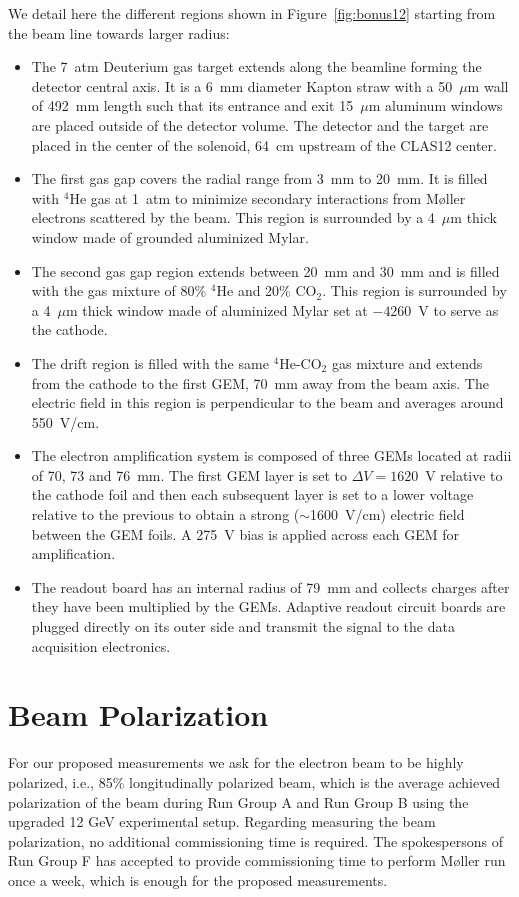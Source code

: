 We detail here the different regions shown in Figure~\ref{fig:bonus12} starting 
from the beam line towards larger radius:\\
\begin{itemize}
  \item The 7~atm Deuterium gas target extends along the beamline forming the 
     detector central axis. It is a 6~mm diameter Kapton straw with a 50~$\mu$m 
      wall of 492~mm length such that its entrance and exit 15~$\mu$m aluminum 
      windows are placed outside of the detector volume.  The detector and the 
      target are placed in the center of the solenoid, 64~cm upstream of the 
      CLAS12 center.
   \item The first gas gap covers the radial range from 3~mm to 20~mm. It is 
      filled with $^{4}$He gas at 1~atm to minimize secondary interactions from
      M\o{}ller electrons scattered by the beam. This region is surrounded by a 
      4~$\mu$m thick window made of grounded aluminized Mylar.
   \item The second gas gap region extends between 20~mm and 30~mm and is 
      filled with the gas mixture of 80$\%$ $^{4}$He and 20$\%$ CO$_2$. This 
      region is surrounded by a 4~$\mu$m thick window made of aluminized Mylar 
      set at $-4260$~V to serve as the cathode.
   \item The drift region is filled with the same $^4$He-CO$_2$ gas mixture and 
      extends from the cathode to the first GEM, 70~mm away from the beam axis.  
      The electric field in this region is perpendicular to the beam and 
      averages around 550~V/cm.
   \item The electron amplification system is composed of three GEMs located at 
      radii of 70, 73 and 76~mm. The first GEM layer is set to $\Delta 
      V=1620$~V relative to the cathode foil and then each subsequent layer is 
      set to a lower voltage relative to the previous to obtain a strong 
      ($\sim$1600~V/cm) electric field between the GEM foils. A 275~V bias is 
      applied across each GEM for amplification.
   \item The readout board has an internal radius of 79~mm and collects charges 
      after they have been multiplied by the GEMs. Adaptive readout circuit 
      boards are plugged directly on its outer side and transmit the signal to 
      the data acquisition electronics.
\end{itemize}



\section{Beam Polarization}
For our proposed measurements we ask for the electron beam to be highly 
polarized, i.e., 85\% longitudinally polarized beam, which is the average 
achieved polarization of the beam during Run Group A and Run Group B using the 
upgraded 12 GeV experimental setup. Regarding measuring the beam polarization, 
no additional commissioning time is required. The spokespersons of Run Group F 
\cite{skuhn} has accepted to provide commissioning time to perform M{\o}ller 
run once a week, which is enough for the proposed measurements.    

